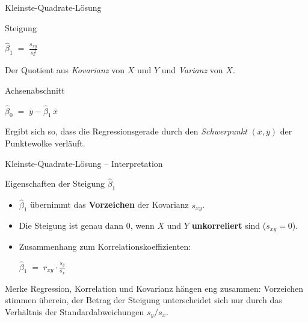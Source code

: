 \documentclass[aspectratio=169,11pt]{beamer}
\begin{document}
\begin{frame}{Kleinste-Quadrate-Lösung}
  \begin{block}{Steigung}
    \begin{center}
      $\displaystyle
        \hat{\beta}_1 \;=\; \frac{s_{xy}}{s_x^{\,2}}
      $
    \end{center}
    Der Quotient aus \emph{Kovarianz} von $X$ und $Y$ und \emph{Varianz}
    von $X$.
  \end{block}

  \begin{block}{Achsenabschnitt}
    \begin{center}
      $\displaystyle
        \hat{\beta}_0 \;=\; \bar{y} - \hat{\beta}_1 \, \bar{x}
      $
    \end{center}
    Ergibt sich so, dass die Regressionsgerade durch den
    \emph{Schwerpunkt} $(\bar{x}, \bar{y})$ der Punktewolke verläuft.
  \end{block}
\end{frame}


\begin{frame}{Kleinste-Quadrate-Lösung -- Interpretation}
  \begin{exampleblock}{Eigenschaften der Steigung $\hat{\beta}_1$}
    \begin{itemize}
      \item $\hat{\beta}_1$ übernimmt das \textbf{Vorzeichen} der
            Kovarianz $s_{xy}$.
      \item Die Steigung ist genau dann $0$, wenn $X$ und $Y$
            \textbf{unkorreliert} sind ($s_{xy} = 0$).
      \item Zusammenhang zum Korrelationskoeffizienten:
            \begin{center}
              $\displaystyle
                \hat{\beta}_1 \;=\; r_{xy} \cdot \frac{s_y}{s_x}
              $
            \end{center}
    \end{itemize}
  \end{exampleblock}

  \begin{block}{Merke}
    Regression, Korrelation und Kovarianz hängen eng zusammen:
    Vorzeichen stimmen überein, der Betrag der
    Steigung unterscheidet sich nur durch das Verhältnis der
    Standard\-abweichungen $s_y / s_x$.
  \end{block}
\end{frame}
\end{document}
